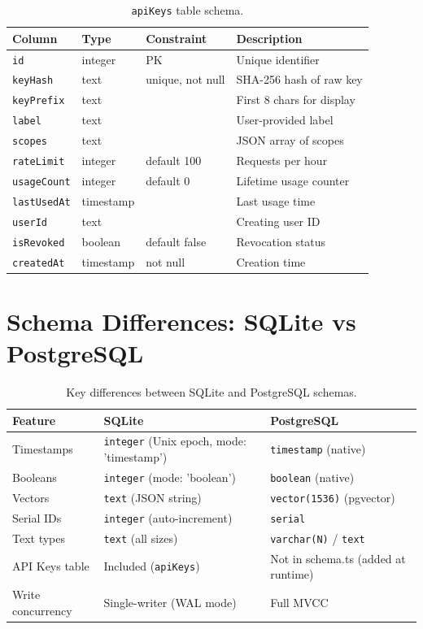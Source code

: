 \begin{longtable}{lllp{4cm}}
\caption{\texttt{apiKeys} table schema.} \label{tab:schema-apikeys} \\
\toprule
\textbf{Column} & \textbf{Type} & \textbf{Constraint} & \textbf{Description} \\
\midrule
\endfirsthead
\texttt{id} & integer & PK & Unique identifier \\
\texttt{keyHash} & text & unique, not null & SHA-256 hash of raw key \\
\texttt{keyPrefix} & text & & First 8 chars for display \\
\texttt{label} & text & & User-provided label \\
\texttt{scopes} & text & & JSON array of scopes \\
\texttt{rateLimit} & integer & default 100 & Requests per hour \\
\texttt{usageCount} & integer & default 0 & Lifetime usage counter \\
\texttt{lastUsedAt} & timestamp & & Last usage time \\
\texttt{userId} & text & & Creating user ID \\
\texttt{isRevoked} & boolean & default false & Revocation status \\
\texttt{createdAt} & timestamp & not null & Creation time \\
\bottomrule
\end{longtable}

\section{Schema Differences: SQLite vs PostgreSQL}
\label{sec:schema:diff}

\begin{table}[H]
\centering
\caption{Key differences between SQLite and PostgreSQL schemas.}
\label{tab:schema-diff}
\begin{tabularx}{\textwidth}{lXX}
\toprule
\textbf{Feature} & \textbf{SQLite} & \textbf{PostgreSQL} \\
\midrule
Timestamps & \texttt{integer} (Unix epoch, mode: 'timestamp') & \texttt{timestamp} (native) \\
Booleans & \texttt{integer} (mode: 'boolean') & \texttt{boolean} (native) \\
Vectors & \texttt{text} (JSON string) & \texttt{vector(1536)} (pgvector) \\
Serial IDs & \texttt{integer} (auto-increment) & \texttt{serial} \\
Text types & \texttt{text} (all sizes) & \texttt{varchar(N)} / \texttt{text} \\
API Keys table & Included (\texttt{apiKeys}) & Not in schema.ts (added at runtime) \\
Write concurrency & Single-writer (WAL mode) & Full MVCC \\
\bottomrule
\end{tabularx}
\end{table}
